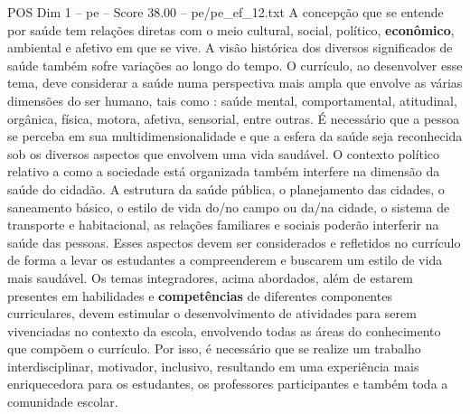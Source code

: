 \begin{textsample}{POS Dim 1 – pe – Score 38.00 – pe/pe\_ef\_12.txt}
A concepção que se entende por saúde tem relações diretas com o meio cultural, social, político, \textbf{econômico}, ambiental e afetivo em que se vive.
A visão histórica dos diversos significados de saúde também sofre variações ao longo do tempo.
O currículo, ao desenvolver esse tema, deve considerar a saúde numa perspectiva mais ampla que envolve as várias dimensões do ser humano, tais como : saúde mental, comportamental, atitudinal, orgânica, física, motora, afetiva, sensorial, entre outras.
É necessário que a pessoa se perceba em sua multidimensionalidade e que a esfera da saúde seja reconhecida sob os diversos aspectos que envolvem uma vida saudável.
O contexto político relativo a como a sociedade está organizada também interfere na dimensão da saúde do cidadão.
A estrutura da saúde pública, o planejamento das cidades, o saneamento básico, o estilo de vida do/no campo ou da/na cidade, o sistema de transporte e habitacional, as relações familiares e sociais poderão interferir na saúde das pessoas.
Esses aspectos devem ser considerados e refletidos no currículo de forma a levar os estudantes a compreenderem e buscarem um estilo de vida mais saudável.
Os temas integradores, acima abordados, além de estarem presentes em habilidades e \textbf{competências} de diferentes componentes curriculares, devem estimular o desenvolvimento de atividades para serem vivenciadas no contexto da escola, envolvendo todas as áreas do conhecimento que compõem o currículo.
Por isso, é necessário que se realize um trabalho interdisciplinar, motivador, inclusivo, resultando em uma experiência mais enriquecedora para os estudantes, os professores participantes e também toda a comunidade escolar.

\end{textsample}
